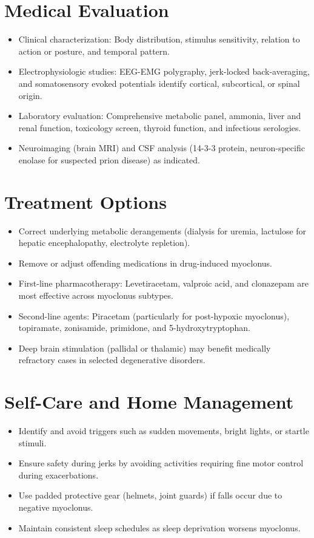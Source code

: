 \section*{Medical Evaluation}
\begin{itemize}
  \item Clinical characterization: Body distribution, stimulus sensitivity, relation to action or posture, and temporal pattern.
  \item Electrophysiologic studies: EEG-EMG polygraphy, jerk-locked back-averaging, and somatosensory evoked potentials identify cortical, subcortical, or spinal origin.
  \item Laboratory evaluation: Comprehensive metabolic panel, ammonia, liver and renal function, toxicology screen, thyroid function, and infectious serologies.
  \item Neuroimaging (brain MRI) and CSF analysis (14-3-3 protein, neuron-specific enolase for suspected prion disease) as indicated.
\end{itemize}

\section*{Treatment Options}
\begin{itemize}
  \item Correct underlying metabolic derangements (dialysis for uremia, lactulose for hepatic encephalopathy, electrolyte repletion).
  \item Remove or adjust offending medications in drug-induced myoclonus.
  \item First-line pharmacotherapy: Levetiracetam, valproic acid, and clonazepam are most effective across myoclonus subtypes.
  \item Second-line agents: Piracetam (particularly for post-hypoxic myoclonus), topiramate, zonisamide, primidone, and 5-hydroxytryptophan.
  \item Deep brain stimulation (pallidal or thalamic) may benefit medically refractory cases in selected degenerative disorders.
\end{itemize}

\section*{Self-Care and Home Management}
\begin{itemize}
  \item Identify and avoid triggers such as sudden movements, bright lights, or startle stimuli.
  \item Ensure safety during jerks by avoiding activities requiring fine motor control during exacerbations.
  \item Use padded protective gear (helmets, joint guards) if falls occur due to negative myoclonus.
  \item Maintain consistent sleep schedules as sleep deprivation worsens myoclonus.
\end{itemize}

